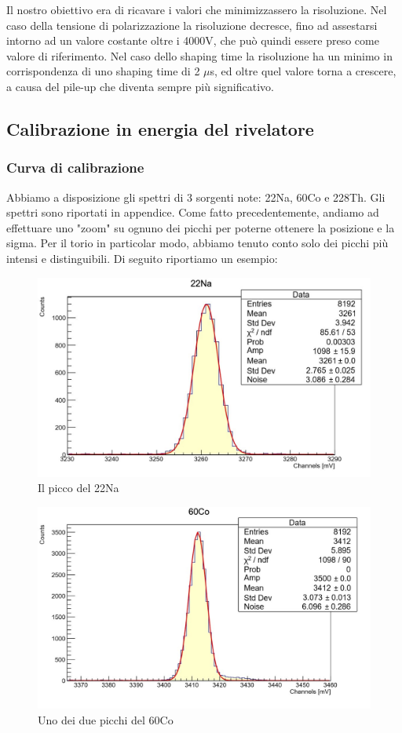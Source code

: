 \documentclass[a4paper,10pt]{article}
\begin{document}
Il nostro obiettivo era di ricavare i valori che minimizzassero la risoluzione. Nel caso della tensione di polarizzazione la risoluzione decresce, fino ad assestarsi intorno ad un valore costante oltre i 4000V, che può quindi essere preso come valore di riferimento. Nel caso dello shaping time la risoluzione ha un minimo in corrispondenza di uno shaping time di 2 $\mu$s, ed oltre quel valore torna a crescere, a causa del pile-up che diventa sempre più significativo.
\subsection{Calibrazione in energia del rivelatore}
\subsubsection{Curva di calibrazione}
Abbiamo a disposizione gli spettri di 3 sorgenti note: 22Na, 60Co e 228Th. Gli spettri sono riportati in appendice. Come fatto precedentemente, andiamo ad effettuare uno "zoom" su ognuno dei picchi per poterne ottenere la posizione e la sigma. Per il torio in particolar modo, abbiamo tenuto conto solo dei picchi più intensi e distinguibili. Di seguito riportiamo un esempio:

\begin{figure}[h!]
    \centering
    \includegraphics[scale=0.45]{grafici/piccoNa}
    \caption{Il picco del 22Na}
\end{figure}

\begin{figure}[h!]
    \centering
    \includegraphics[scale=0.45]{grafici/piccoCo}
    \caption{Uno dei due picchi del 60Co}
\end{figure}
\end{document}
